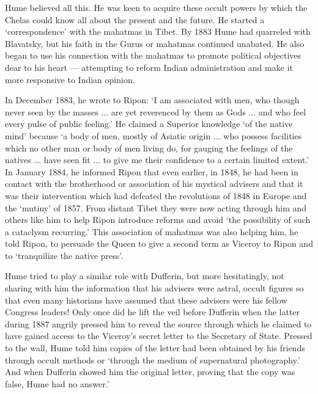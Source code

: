 \begin{multicols}{2}
Hume believed all this. He was keen to acquire these occult powers by which the Chelas could know all about the present and the future. He started a `correspondence' with the mahatmas in Tibet. By 1883 Hume had quarreled with Blavatsky, but his faith in the Gurus or mahatmas continued unabated. He also began to use his connection with the mahatmas to promote political objectives dear to his heart --- attempting to reform Indian administration and make it more responsive to Indian opinion.

In December 1883, he wrote to Ripon: `I am associated with men, who though never seen by the masses ... are yet reverenced by them as Gods ... and who feel every pulse of public feeling.' He claimed a Superior knowledge `of the native mind' because `a body of men, mostly of Asiatic origin ... who possess facilities which no other man or body of men living do, for gauging the feelings of the natives ... have seen fit ... to give me their confidence to a certain limited extent.' In January 1884, he informed Ripon that even earlier, in 1848, he had been in contact with the brotherhood or association of his mystical advisers and that it was their intervention which had defeated the revolutions of 1848 in Europe and the `mutiny' of 1857. From distant Tibet they were now acting through him and others like him to help Ripon introduce reforms and avoid `the possibility of such a cataclysm recurring.' This association of mahatmas was also helping him, he told Ripon, to persuade the Queen to give a second term as Viceroy to Ripon and to `tranquilize the native press'.

Hume tried to play a similar role with Dufferin, but more hesitatingly, not sharing with him the information that his advisers were astral, occult figures so that even many historians have assumed that these advisers were his fellow Congress leaders! Only once did he lift the veil before Dufferin when the latter during 1887 angrily pressed him to reveal the source through which he claimed to have gained access to the Viceroy's secret letter to the Secretary of State. Pressed to the wall, Hume told him copies of the letter had been obtained by his friends through occult methods or `through the medium of supernatural photography.' And when Dufferin showed him the original letter, proving that the copy was false, Hume had no answer.'


\end{multicols}
